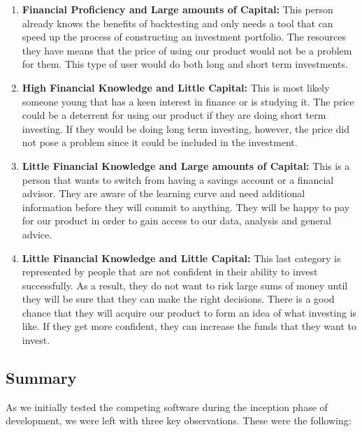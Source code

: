 \documentclass[main.tex]{subfiles}
\begin{document}
\begin{enumerate}
    \item \textbf{Financial Proficiency and Large amounts of Capital:  }This person already knows the benefits of backtesting and only needs a tool that can speed up the process of constructing an investment portfolio. The resources they have means that the price of using our product would not be a problem for them. This type of user would do both long and short term investments.
    \item \textbf{High Financial Knowledge and Little Capital:  } This is most likely someone young that has a keen interest in finance or is studying it. The price could be a deterrent for using our product if they are doing short term investing. If they would be doing long term investing, however, the price did not pose a problem since it could be included in the investment.
    \item \textbf{Little Financial Knowledge and Large amounts of Capital:  }This is a person that wants to switch from having a savings account or a financial advisor. They are aware of the learning curve and need additional information before they will commit to anything. They will be happy to pay for our product in order to gain access to our data, analysis and general advice.
    \item \textbf{Little Financial Knowledge and Little Capital:  }This  last category is represented by people that are not confident in their ability to invest successfully. As a result, they do not want to risk large sums of money until they will be sure that they can make the right decisions. There is a good chance that they will acquire our product to form an idea of what investing is like. If they get more confident, they can increase the funds that they want to invest.
\end{enumerate}


\subsection{Summary}

As we initially tested the competing software during the inception phase of development, we were left with three key observations. These were the following:
\end{document}

